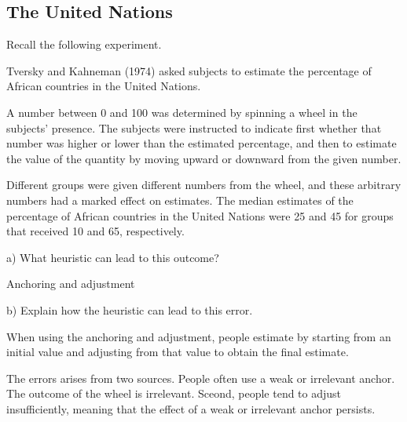\documentclass[
  letterpaper,
  DIV=11,
  numbers=noendperiod]{scrreprt}
\begin{document}
\hypertarget{the-united-nations}{%
\subsection{The United Nations}\label{the-united-nations}}

Recall the following experiment.

Tversky and Kahneman (1974) asked subjects to estimate the percentage of
African countries in the United Nations.

A number between 0 and 100 was determined by spinning a wheel in the
subjects' presence. The subjects were instructed to indicate first
whether that number was higher or lower than the estimated percentage,
and then to estimate the value of the quantity by moving upward or
downward from the given number.

Different groups were given different numbers from the wheel, and these
arbitrary numbers had a marked effect on estimates. The median estimates
of the percentage of African countries in the United Nations were 25 and
45 for groups that received 10 and 65, respectively.

a) What heuristic can lead to this outcome?

\begin{tcolorbox}[enhanced jigsaw, title=\textcolor{quarto-callout-tip-color}{\faLightbulb}\hspace{0.5em}{Answer}, toprule=.15mm, colback=white, breakable, titlerule=0mm, colframe=quarto-callout-tip-color-frame, coltitle=black, opacityback=0, rightrule=.15mm, colbacktitle=quarto-callout-tip-color!10!white, bottomtitle=1mm, opacitybacktitle=0.6, arc=.35mm, bottomrule=.15mm, toptitle=1mm, leftrule=.75mm, left=2mm]

Anchoring and adjustment

\end{tcolorbox}

b) Explain how the heuristic can lead to this error.

\begin{tcolorbox}[enhanced jigsaw, title=\textcolor{quarto-callout-tip-color}{\faLightbulb}\hspace{0.5em}{Answer}, toprule=.15mm, colback=white, breakable, titlerule=0mm, colframe=quarto-callout-tip-color-frame, coltitle=black, opacityback=0, rightrule=.15mm, colbacktitle=quarto-callout-tip-color!10!white, bottomtitle=1mm, opacitybacktitle=0.6, arc=.35mm, bottomrule=.15mm, toptitle=1mm, leftrule=.75mm, left=2mm]

When using the anchoring and adjustment, people estimate by starting
from an initial value and adjusting from that value to obtain the final
estimate.

The errors arises from two sources. People often use a weak or
irrelevant anchor. The outcome of the wheel is irrelevant. Sceond,
people tend to adjust insufficiently, meaning that the effect of a weak
or irrelevant anchor persists.

\end{tcolorbox}
\end{document}
